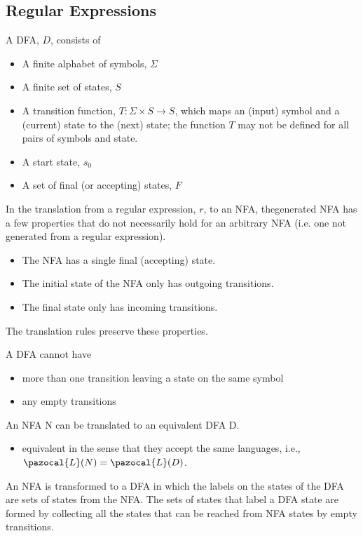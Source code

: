 \subsection{Regular Expressions}
A DFA, $D$, consists of
\begin{itemize}
    \item A finite alphabet of symbols, $\Sigma$
    \item A finite set of states, $S$
    \item A transition function, $T : \Sigma \times S \rightarrow S$, which maps an (input) symbol and a (current) state to the (next) state; the function $T$ may not be defined for all pairs of symbols and state. 
    \item A start state, $s_0$ 
    \item A set of final (or accepting) states, $F$
\end{itemize}



In the translation from a regular expression, $r$, to an NFA, thegenerated NFA has a few properties that do not necessarily hold for an arbitrary NFA (i.e. one not generated from a regular expression).
\begin{itemize}
    \item The NFA has a single final (accepting) state.
    \item The initial state of the NFA only has outgoing transitions.
    \item The final state only has incoming transitions.
\end{itemize}
The translation rules preserve these properties.

A DFA cannot have 
\begin{itemize}
    \item more than one transition leaving a state on the same symbol
    \item any empty transitions
\end{itemize}
An NFA N can be translated to an equivalent DFA D.
\begin{itemize}
    \item equivalent in the sense that they accept the same languages, i.e., $\pazocal{L}(N) = \pazocal{L}(D)$.
\end{itemize}

An NFA is transformed to a DFA in which the labels on the states of the DFA are sets of states from the NFA.
The sets of states that label a DFA state are formed by collecting all the states that can be reached from NFA states by empty transitions. 

